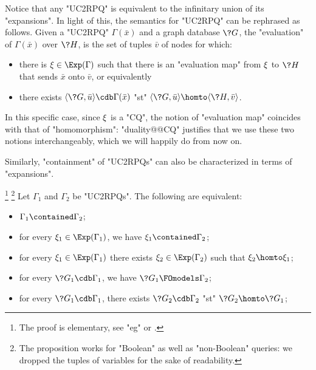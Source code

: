 Notice that any "UC2RPQ" is equivalent to the infinitary union of its "expansions". In light of this, the semantics for "UC2RPQ" can be rephrased as follows. 
Given a "UC2RPQ" $\Gamma(\bar x)$ and a graph database $\?G$, 
the "evaluation" of $\Gamma(\bar x)$ over $\?H$, is the set of tuples 
$\bar{v}$ of nodes for which:
\begin{itemize}
    \item there is $\anexpansion \in \Exp(\Gamma)$ such that there is an "evaluation map" from $\xi$ to $\?H$ that sends $\bar x$ onto $\bar v$, or equivalently
    \item there exists $\tup{\?G, \bar u} \cdb \Gamma(\bar x)$ "st"
    $\tup{\?G, \bar u} \homto \tup{\?H, \bar v}$.
\end{itemize}
In this specific case, since $\xi$ is a "CQ", the notion of "evaluation map"
coincides with that of "homomorphism":
"duality@@CQ" justifies that we use these two notions interchangeably, which we will
happily do from now on.

Similarly, "containment" of "UC2RPQs" can also be characterized in terms of "expansions".
\begin{proposition}[Folklore]
    \!\footnote{The proof is elementary,
    see "eg" \cite[Proposition 3.2]{FlorescuLevySuciu1998Containment} 
    or \cite[Theorem 2]{CalvaneseDeGiacomoLenzeriniVardi2000Containment}.}
    \footnote{The proposition works for "Boolean" as well as "non-Boolean" queries:
    we dropped the tuples of variables for the sake of readability.}
    \AP\label{prop:cont-char-exp-st}
    Let $\Gamma_1$ and $\Gamma_2$ be "UC2RPQs". The following are equivalent:
    \begin{itemize}
        \item $\Gamma_1 \contained \Gamma_2$;
        \item for every $\anexpansion_1\in \Exp(\Gamma_1)$, we have $\anexpansion_1 \contained \Gamma_2$;
        \item for every $\anexpansion_1\in \Exp(\Gamma_1)$ there exists $\anexpansion_2\in \Exp(\Gamma_2)$ such that $\anexpansion_2\homto \anexpansion_1$;
        \item for every $\?G_1 \cdb \Gamma_1$, we have $\?G_1 \FOmodels \Gamma_2$;
        \item for every $\?G_1 \cdb \Gamma_1$, there exists $\?G_2 \cdb \Gamma_2$
        "st" $\?G_2 \homto \?G_1$;
    \end{itemize}
\end{proposition}

